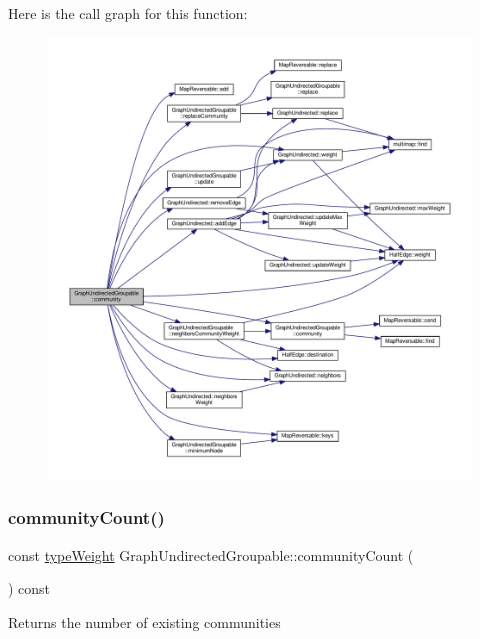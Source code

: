Here is the call graph for this function\+:
\nopagebreak
\begin{figure}[H]
\begin{center}
\leavevmode
\includegraphics[width=350pt]{classGraphUndirectedGroupable_a7a9642a50ac522d9020afb9df211702f_cgraph}
\end{center}
\end{figure}
\mbox{\label{classGraphUndirectedGroupable_adf6ebb83c3df6317f122a13650309ac4}} 
\subsubsection{\texorpdfstring{community\+Count()}{communityCount()}}
{\footnotesize\ttfamily const \hyperlink{edge_8h_a2e7ea3be891ac8b52f749ec73fee6dd2}{type\+Weight} Graph\+Undirected\+Groupable\+::community\+Count (\begin{DoxyParamCaption}{ }\end{DoxyParamCaption}) const\hspace{0.3cm}{\ttfamily [inline]}}

\begin{DoxyReturn}{Returns}
the number of existing communities 
\end{DoxyReturn}


